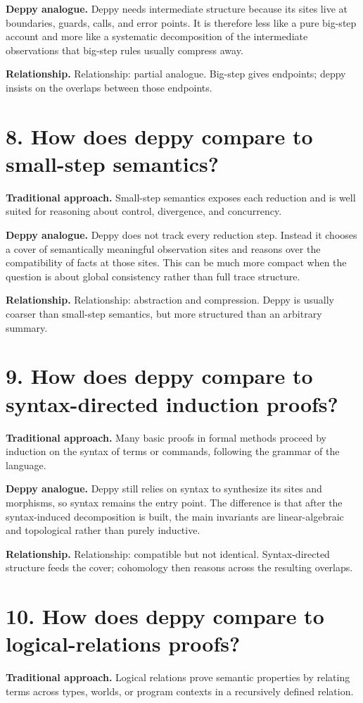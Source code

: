 \documentclass[11pt,openany]{book}
\begin{document}
\textbf{Deppy analogue.} Deppy needs intermediate structure because its sites live at boundaries, guards, calls, and error points. It is therefore less like a pure big-step account and more like a systematic decomposition of the intermediate observations that big-step rules usually compress away.

\textbf{Relationship.} Relationship: partial analogue. Big-step gives endpoints; deppy insists on the overlaps between those endpoints.

\section*{8. How does deppy compare to small-step semantics?}
\textbf{Traditional approach.} Small-step semantics exposes each reduction and is well suited for reasoning about control, divergence, and concurrency.

\textbf{Deppy analogue.} Deppy does not track every reduction step. Instead it chooses a cover of semantically meaningful observation sites and reasons over the compatibility of facts at those sites. This can be much more compact when the question is about global consistency rather than full trace structure.

\textbf{Relationship.} Relationship: abstraction and compression. Deppy is usually coarser than small-step semantics, but more structured than an arbitrary summary.

\section*{9. How does deppy compare to syntax-directed induction proofs?}
\textbf{Traditional approach.} Many basic proofs in formal methods proceed by induction on the syntax of terms or commands, following the grammar of the language.

\textbf{Deppy analogue.} Deppy still relies on syntax to synthesize its sites and morphisms, so syntax remains the entry point. The difference is that after the syntax-induced decomposition is built, the main invariants are linear-algebraic and topological rather than purely inductive.

\textbf{Relationship.} Relationship: compatible but not identical. Syntax-directed structure feeds the cover; cohomology then reasons across the resulting overlaps.

\section*{10. How does deppy compare to logical-relations proofs?}
\textbf{Traditional approach.} Logical relations prove semantic properties by relating terms across types, worlds, or program contexts in a recursively defined relation.
\end{document}
